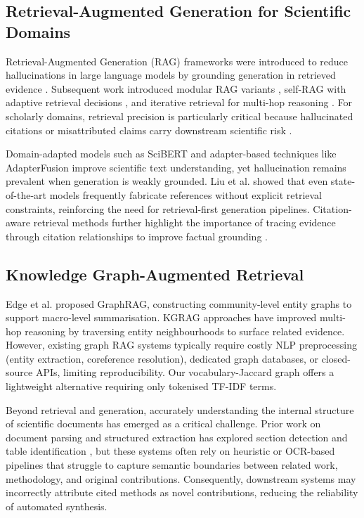 \documentclass[conference,10pt,twocolumn]{IEEEtran}
\begin{document}
\subsection{Retrieval-Augmented Generation for Scientific Domains}

Retrieval-Augmented Generation (RAG) frameworks were introduced to reduce hallucinations in large language models by grounding generation in retrieved evidence \cite{lewis2020rag}. Subsequent work introduced modular RAG variants \cite{gao2024modular}, self-RAG with adaptive retrieval decisions \cite{asai2024selfrag}, and iterative retrieval for multi-hop reasoning \cite{trivedi2023interleaving}. For scholarly domains, retrieval precision is particularly critical because hallucinated citations or misattributed claims carry downstream scientific risk \cite{liu2023factual}.

Domain-adapted models such as SciBERT \cite{beltagy2019scibert} and adapter-based techniques like AdapterFusion \cite{pfeiffer2021adapterfusion} improve scientific text understanding, yet hallucination remains prevalent when generation is weakly grounded. Liu et al. \cite{liu2023factual} showed that even state-of-the-art models frequently fabricate references without explicit retrieval constraints, reinforcing the need for retrieval-first generation pipelines. Citation-aware retrieval methods further highlight the importance of tracing evidence through citation relationships to improve factual grounding \cite{zhang2021citation}.

\subsection{Knowledge Graph-Augmented Retrieval}

Edge et al. \cite{edge2024graphrag} proposed GraphRAG, constructing community-level entity graphs to support macro-level summarisation. KGRAG approaches \cite{he2024gretriever} have improved multi-hop reasoning by traversing entity neighbourhoods to surface related evidence. However, existing graph RAG systems typically require costly NLP preprocessing (entity extraction, coreference resolution), dedicated graph databases, or closed-source APIs, limiting reproducibility. Our vocabulary-Jaccard graph offers a lightweight alternative requiring only tokenised TF-IDF terms.

Beyond retrieval and generation, accurately understanding the internal structure of scientific documents has emerged as a critical challenge. Prior work on document parsing and structured extraction has explored section detection and table identification \cite{delatorre2023ai,vandinter2021automation}, but these systems often rely on heuristic or OCR-based pipelines that struggle to capture semantic boundaries between related work, methodology, and original contributions. Consequently, downstream systems may incorrectly attribute cited methods as novel contributions, reducing the reliability of automated synthesis.
\end{document}
